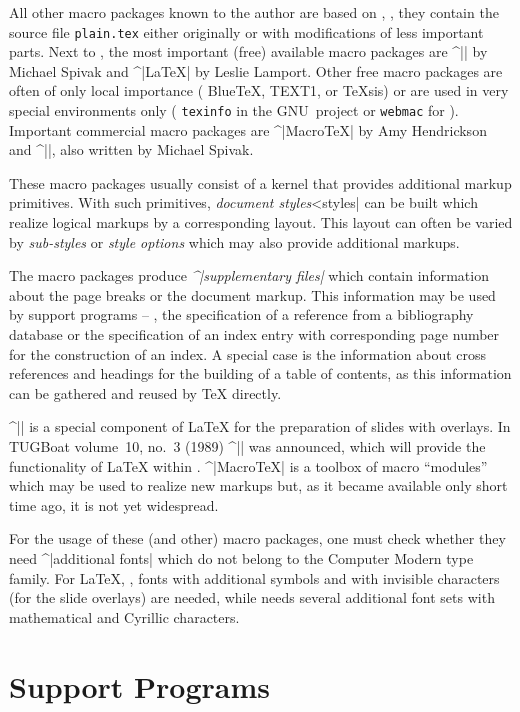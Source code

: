 All other macro packages known to the author are based on \Plain{},
\ie{}, they contain the source file {\tt plain.tex\/} either
originally or with modifications of less important parts. Next to
\Plain{}, the most important (free) available macro packages are
^|\AmSTeX{}| by {\sc Michael Spivak} and ^|\LaTeX{}| by {\sc Leslie
Lamport}. Other free macro packages are often of only local
importance (\eg{} Blue\TeX{}, TEXT1, or \TeX{}sis) or are used in
very special environments only (\eg{} {\tt texinfo\/} in the
GNU~project or {\tt webmac\/} for \WEB{}). Important commercial macro
packages are ^|Macro\TeX{}| by {\sc Amy Hendrickson} and
^|\LAMSTeX{}|, also written by {\sc Michael Spivak}.

These macro packages usually consist of a kernel that
provides additional markup primitives. With such primitives,
{\it document styles\/}^^|styles| can be built which realize logical
markups by a corresponding layout. This layout can often be varied by
{\it sub-styles\/} or {\it style options\/} which may also provide
additional markups.

The macro packages produce {\it ^|supplementary files|\/} which contain
information about the page breaks or the document markup. This
information may be used by support programs -- \eg{}, the
specification of a reference from a bibliography database or the
specification of an index entry with corresponding page number for the
construction of an index. A special case is the information about
cross references and headings for the building of a table of contents,
as this information can be gathered and reused by \TeX{} directly.

^|\SliTeX{}| is a special component of \LaTeX{} for the preparation
of slides with overlays. In TUGBoat volume~10, no.~3 (1989)
^|\LAMSTeX{}| was announced, which will provide the functionality of
\LaTeX{} within \AmSTeX{}. ^|Macro\TeX{}| is a toolbox of macro
``modules'' which may be used to realize new markups but, as it
became available only short time ago, it is not yet widespread.

For the usage of these (and other) macro packages, one must check
whether they need ^|additional fonts| which do not belong to the Computer
Modern type family. For \LaTeX{}, \eg{}, fonts with additional symbols
and with invisible characters (for the slide overlays) are needed,
while \AmSTeX{} needs several additional font sets with mathematical and
Cyrillic characters.



\section{Support Programs}

